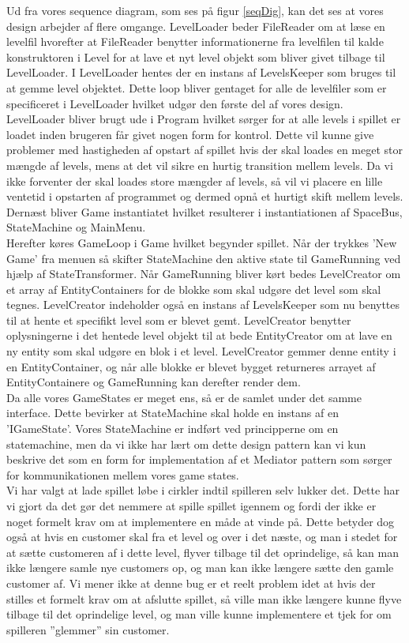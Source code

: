 Ud fra vores sequence diagram, som ses på figur \ref{seqDig}, kan det ses at vores design arbejder af flere omgange. LevelLoader beder FileReader om at læse en levelfil hvorefter at FileReader benytter informationerne fra levelfilen til kalde konstruktoren i Level for at lave et nyt level objekt som bliver givet tilbage til LevelLoader. I LevelLoader hentes der en instans af LevelsKeeper som bruges til at gemme level objektet. Dette loop bliver gentaget for alle de levelfiler som er specificeret i LevelLoader hvilket udgør den første del af vores design. LevelLoader bliver brugt ude i Program hvilket sørger for at alle levels i spillet er loadet inden brugeren får givet nogen form for kontrol. Dette vil kunne give problemer med hastigheden af opstart af spillet hvis der skal loades en meget stor mængde af levels, mens at det vil sikre en hurtig transition mellem levels. Da vi ikke forventer der skal loades store mængder af levels, så vil vi placere en lille ventetid i opstarten af programmet og dermed opnå et hurtigt skift mellem levels. \\
Dernæst bliver Game instantiatet hvilket resulterer i instantiationen af SpaceBus, StateMachine og MainMenu.\\
Herefter køres GameLoop i Game hvilket begynder spillet. Når der trykkes 'New Game' fra menuen så skifter StateMachine den aktive state til GameRunning ved hjælp af StateTransformer. Når GameRunning bliver kørt bedes LevelCreator om et array af EntityContainers for de blokke som skal udgøre det level som skal tegnes. LevelCreator indeholder også en instans af LevelsKeeper som nu benyttes til at hente et specifikt level som er blevet gemt. LevelCreator benytter oplysningerne i det hentede level objekt til at bede EntityCreator om at lave en ny entity som skal udgøre en blok i et level. LevelCreator gemmer denne entity i en EntityContainer, og når alle blokke er blevet bygget returneres arrayet af EntityContainere og GameRunning kan derefter render dem.\\
Da alle vores GameStates er meget ens, så er de samlet under det samme interface. Dette bevirker at StateMachine skal holde en instans af en 'IGameState'. Vores StateMachine er indført ved principperne om en statemachine, men da vi ikke har lært om dette design pattern kan vi kun beskrive det som en form for implementation af et Mediator pattern som sørger for kommunikationen mellem vores game states.\\

Vi har valgt at lade spillet løbe i cirkler indtil spilleren selv lukker det. Dette har vi gjort da det gør det nemmere at spille spillet igennem og fordi der ikke er noget formelt krav om at implementere en måde at vinde på. Dette betyder dog også at hvis en customer skal fra et level og over i det næste, og man i stedet for at sætte customeren af i dette level, flyver tilbage til det oprindelige, så kan man ikke længere samle nye customers op, og man kan ikke længere sætte den gamle customer af. Vi mener ikke at denne bug er et reelt problem idet at hvis der stilles et formelt krav om at afslutte spillet, så ville man ikke længere kunne flyve tilbage til det oprindelige level, og man ville kunne implementere et tjek for om spilleren ''glemmer'' sin customer.

